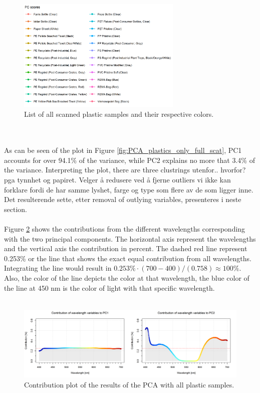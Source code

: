 \begin{figure}[H]
   \centering
    \includegraphics[width=0.7\textwidth]{Images/results/PCA_plastics_full_list.png}
  \caption{List of all scanned plastic samples and their respective colors.}
  \label{fig:PCA_plastics_full_list}
\end{figure}
\\\\
\noindent
As can be seen of the plot in Figure \ref{fig:PCA_plastics_only_full_scat}, PC1 accounts for over 94.1\% of the variance, while PC2 explains no more that 3.4\% of the variance. Interpreting the plot, there are three clustrings utenfor.. hvorfor? pga tynnhet og papiret. Velger å redusere ved å fjerne outliers vi ikke kan forklare fordi de har samme lyshet, farge og type som flere av de som ligger inne. Det resulterende sette, etter removal of outlying variables, presenteres i neste section.
\\\\
Figure \ref{fig:PCA_plastics_full_doub_cont} shows the contributions from the different wavelengths corresponding with the two principal components. The horizontal axis represent the wavelengths and the vertical axis the contribution in percent. The dashed red line represent 0.253\% or the line that shows the exact equal contribution from all wavelengths. Integrating the line would result in $0.253\% \cdot (700 - 400)/(0.758) \approx 100\%$.%
Also, the color of the line depicts the color at that wavelength, the blue color of the line at 450 nm is the color of light with that specific wavelength. 
\\\\%
\begin{figure}[H]
    \centering
    \includegraphics[width=1\textwidth]{Images/results/PCA_plastics_full_doub_cont.png}
    \caption{Contribution plot of the results of the PCA with all plastic samples.}
    \label{fig:PCA_plastics_full_doub_cont}
\end{figure}
